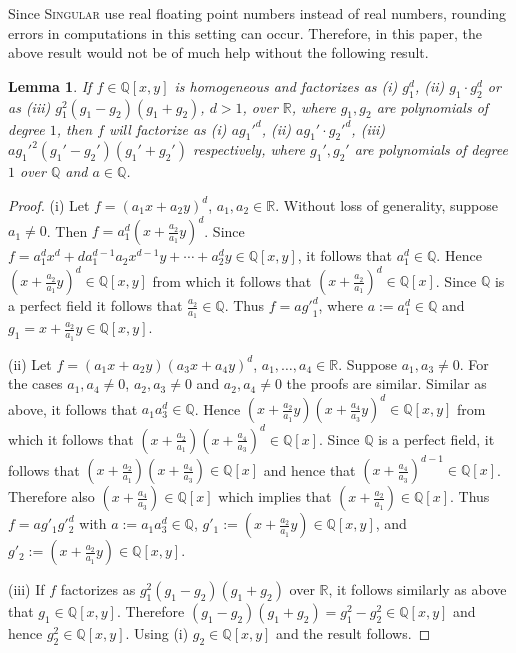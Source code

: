 \documentclass[noend]{amsproc}
\begin{document}
Since \textsc{Singular} use real floating point numbers instead of real
numbers, rounding errors in computations in this setting can
occur. Therefore, in this paper, the above result would not be of much help
without the
following result.
\newtheorem{x^3}[kjet]{Lemma}
\begin{x^3}\label{x^3}
If $f\in\mathbb Q[x,y]$ is homogeneous and factorizes as (i) $g_1^d$, (ii)
$g_1\cdot g_2^{d}$ or as  (iii) $g_1^2(g_1-g_2)(g_1+g_2)$, $d>1$, over
$\mathbb
R$, where $g_1,g_2$ are polynomials of degree $1$, then $f$ will factorize as
(i) $ag_1'^d$, (ii) $ag_1'\cdot g_2'^d$, (iii) $ag_1'^2(g_1'-g_2')(g_1'+g_2')$
respectively,
where $g_1', g_2'$ are polynomials of degree $1$ over $\mathbb Q$ and
$a\in\mathbb Q$.
\end{x^3}
\begin{proof}

(i) Let $f=(a_1x+a_2y)^d$, $a_1,a_2\in\mathbb R$. Without loss of generality,
suppose $a_1\neq 0$. Then $f=a_1^d(x+\frac{a_2}{a_1}y)^d$. Since $f=
a_1^dx^d+da_1^{d-1}a_2x^{d-1}y+\cdots+a_2^dy\in\mathbb Q[x,y]$, it follows
that $a_1^d\in\mathbb Q$. Hence $(x+\frac{a_2}{a_1}y)^d\in\mathbb Q[x,y]$
from which it follows that $(x+\frac{a_2}{a_1})^d\in\mathbb Q[x]$. Since
$\mathbb Q$ is a perfect field it follows that $\frac{a_2}{a_1}\in\mathbb
Q$. Thus $f=a{g'}_1^d$, where $a:=a_1^d\in\mathbb Q$ and
$g_1=x+\frac{a_2}{a_1}y\in\mathbb Q[x,y]$.

(ii) Let $f=(a_1x+a_2y)(a_3x+a_4y)^{d}$, $a_1,\ldots,a_4\in\mathbb
R$. Suppose $a_1,a_3\neq 0$.
For the cases $a_1,a_4\neq 0$, $a_2,a_3\neq 0$ and $a_2,a_4\neq 0$ the
proofs are similar.
Similar as above, it follows that $a_1a_3^{d}\in\mathbb Q$. Hence
$(x+\frac{a_2}{a_1}y)(x+\frac{a_4}{a_3}y)^d\in\mathbb Q[x,y]$ from which
it follows that $(x+\frac{a_2}{a_1})(x+\frac{a_4}{a_3})^d\in\mathbb
Q[x]$. Since $\mathbb Q$ is a perfect field, it follows that
$(x+\frac{a_2}{a_1})(x+\frac{a_4}{a_3})\in\mathbb Q[x]$ and
hence that $(x+\frac{a_4}{a_3})^{d-1}\in\mathbb Q[x]$. Therefore
also $(x+\frac{a_4}{a_3})\in\mathbb Q[x]$ which implies that
$(x+\frac{a_2}{a_1})\in\mathbb Q[x]$.
Thus $f=ag'_1g'^d_2$ with $a:=a_1a_3^d\in\mathbb Q$,
$g'_1:=(x+\frac{a_2}{a_1}y)\in\mathbb Q[x,y]$, and
$g'_2:=(x+\frac{a_2}{a_1}y)\in\mathbb Q[x,y]$.

(iii) If $f$ factorizes as $g_1^2(g_1-g_2)(g_1+g_2)$ over $\mathbb R$, it
follows similarly as above that $g_1\in\mathbb Q[x,y]$. Therefore
$(g_1-g_2)(g_1+g_2)=g_1^2-g_2^2\in\mathbb Q[x,y]$ and hence $g_2^2\in\mathbb
Q[x,y]$. Using (i) $g_2\in\mathbb Q[x,y]$ and the result follows.
\end{proof}
\end{document}
